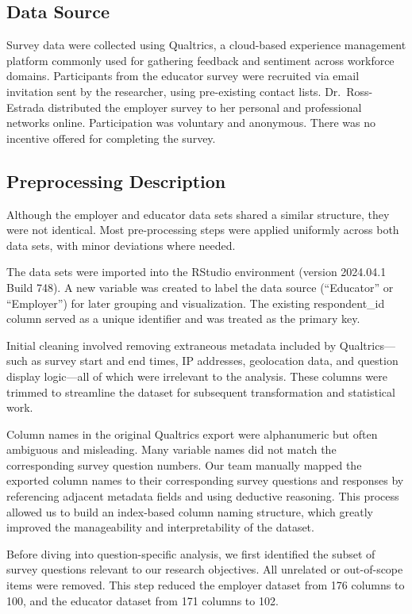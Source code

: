 \documentclass[
  11pt,
  letterpaper,
  DIV=11,
  numbers=noendperiod]{scrartcl}
\numberwithin{figure}{section}
\begin{document}
\subsection{Data Source}\label{data-source}

Survey data were collected using Qualtrics, a cloud-based experience
management platform commonly used for gathering feedback and sentiment
across workforce domains. Participants from the educator survey were
recruited via email invitation sent by the researcher, using
pre-existing contact lists. Dr.~Ross-Estrada distributed the employer
survey to her personal and professional networks online. Participation
was voluntary and anonymous. There was no incentive offered for
completing the survey.

\subsection{Preprocessing Description}\label{preprocessing-description}

Although the employer and educator data sets shared a similar structure,
they were not identical. Most pre-processing steps were applied
uniformly across both data sets, with minor deviations where needed.

The data sets were imported into the RStudio environment (version
2024.04.1 Build 748). A new variable was created to label the data
source (``Educator'' or ``Employer'') for later grouping and
visualization. The existing respondent\_id column served as a unique
identifier and was treated as the primary key.

Initial cleaning involved removing extraneous metadata included by
Qualtrics---such as survey start and end times, IP addresses,
geolocation data, and question display logic---all of which were
irrelevant to the analysis. These columns were trimmed to streamline the
dataset for subsequent transformation and statistical work.

Column names in the original Qualtrics export were alphanumeric but
often ambiguous and misleading. Many variable names did not match the
corresponding survey question numbers. Our team manually mapped the
exported column names to their corresponding survey questions and
responses by referencing adjacent metadata fields and using deductive
reasoning. This process allowed us to build an index-based column naming
structure, which greatly improved the manageability and interpretability
of the dataset.

Before diving into question-specific analysis, we first identified the
subset of survey questions relevant to our research objectives. All
unrelated or out-of-scope items were removed. This step reduced the
employer dataset from 176 columns to 100, and the educator dataset from
171 columns to 102.
\end{document}
